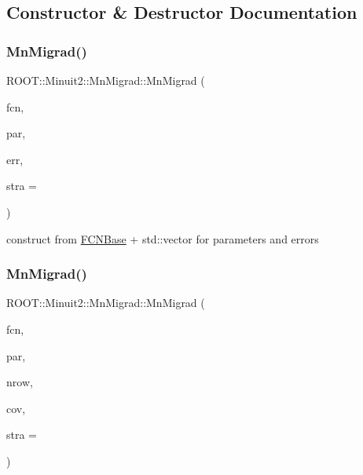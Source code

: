 \subsection{Constructor \& Destructor Documentation}
\mbox{\label{classROOT_1_1Minuit2_1_1MnMigrad_a3a3610c55a91cb68fb3b95506ff08339}} 
\subsubsection{\texorpdfstring{MnMigrad()}{MnMigrad()}\hspace{0.1cm}{\footnotesize\ttfamily [1/39]}}
{\footnotesize\ttfamily R\+O\+O\+T\+::\+Minuit2\+::\+Mn\+Migrad\+::\+Mn\+Migrad (\begin{DoxyParamCaption}\item[{const \mbox{\hyperlink{classROOT_1_1Minuit2_1_1FCNBase}{F\+C\+N\+Base}} \&}]{fcn,  }\item[{const std\+::vector$<$ double $>$ \&}]{par,  }\item[{const std\+::vector$<$ double $>$ \&}]{err,  }\item[{unsigned int}]{stra = {} }\end{DoxyParamCaption})\hspace{0.3cm}{\ttfamily [inline]}}



construct from \mbox{\hyperlink{classROOT_1_1Minuit2_1_1FCNBase}{F\+C\+N\+Base}} + std\+::vector for parameters and errors 

\mbox{\label{classROOT_1_1Minuit2_1_1MnMigrad_a72c6740b17d24c92d0a0049d52de778e}} 
\subsubsection{\texorpdfstring{MnMigrad()}{MnMigrad()}\hspace{0.1cm}{\footnotesize\ttfamily [2/39]}}
{\footnotesize\ttfamily R\+O\+O\+T\+::\+Minuit2\+::\+Mn\+Migrad\+::\+Mn\+Migrad (\begin{DoxyParamCaption}\item[{const \mbox{\hyperlink{classROOT_1_1Minuit2_1_1FCNBase}{F\+C\+N\+Base}} \&}]{fcn,  }\item[{const std\+::vector$<$ double $>$ \&}]{par,  }\item[{unsigned int}]{nrow,  }\item[{const std\+::vector$<$ double $>$ \&}]{cov,  }\item[{unsigned int}]{stra = {} }\end{DoxyParamCaption})\hspace{0.3cm}{\ttfamily [inline]}}



